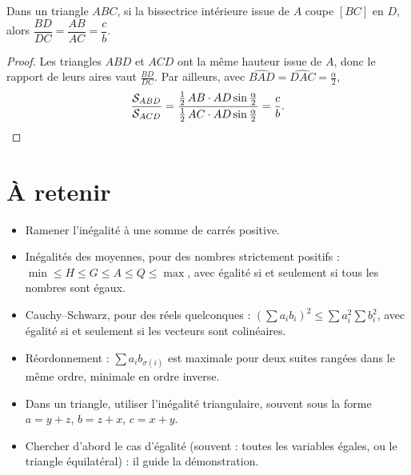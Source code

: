 \documentclass[11pt]{article}
\begin{document}
\begin{proposition}\label{prop:bissectrice}
Dans un triangle $ABC$, si la bissectrice intérieure issue de $A$ coupe
$[BC]$ en $D$, alors $\dfrac{BD}{DC} = \dfrac{AB}{AC} = \dfrac cb$.
\end{proposition}

\begin{proof}
Les triangles $ABD$ et $ACD$ ont la même hauteur issue de $A$, donc le
rapport de leurs aires vaut $\frac{BD}{DC}$. Par ailleurs, avec
$\widehat{BAD} = \widehat{DAC} = \frac\alpha2$,
\[
\frac{\mathcal{S}_{ABD}}{\mathcal{S}_{ACD}}
= \frac{\frac12\,AB \cdot AD \sin\frac\alpha2}{\frac12\,AC \cdot AD \sin\frac\alpha2}
= \frac{c}{b} . \qedhere
\]
\end{proof}



\section{À retenir}\label{sec:retenir}

\begin{retenir}
\begin{itemize}
  \item Ramener l'inégalité à une somme de carrés positive.
  \item Inégalités des moyennes, pour des nombres strictement positifs :
  $\min \leqslant H \leqslant G \leqslant A \leqslant Q \leqslant \max$,
  avec égalité si et seulement si tous les nombres sont égaux.
  \item Cauchy--Schwarz, pour des réels quelconques :
  $\left(\sum a_i b_i\right)^2 \leqslant \sum a_i^2 \sum b_i^2$,
  avec égalité si et seulement si les vecteurs sont colinéaires.
  \item Réordonnement : $\sum a_i b_{\sigma(i)}$ est maximale pour deux
  suites rangées dans le même ordre, minimale en ordre inverse.
  \item Dans un triangle, utiliser l'inégalité triangulaire, souvent sous la
  forme $a = y + z$, $b = z + x$, $c = x + y$.
  \item Chercher d'abord le cas d'égalité (souvent : toutes les variables
  égales, ou le triangle équilatéral) : il guide la démonstration.
\end{itemize}
\end{retenir}
\end{document}
